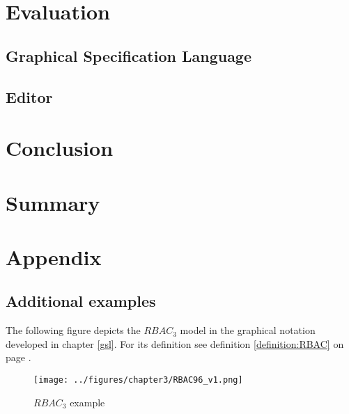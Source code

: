 \documentclass[twoside, openright, 12pt]{book}
\begin{document}



\cleardoublepage
\chapter{Evaluation}
\label{evaluation}



\section{Graphical Specification Language}
\label{evaluation_gsl}

\section{Editor}
\label{evaluation_editor}


\cleardoublepage
\chapter{Conclusion}
\label{conclusion}
\blindtext



\cleardoublepage
\chapter{Summary}
\label{summary}
\blindtext



\cleardoublepage
{}
\renewcommand{\thesection}{\Alph{section}}
\chapter*{Appendix}
\label{appendix}
\section{Additional examples}
The following figure depicts the $RBAC_3$ model in the graphical notation developed in chapter \ref{gsl}.
For its definition see definition \ref{definition:RBAC} on page \pageref{definition:RBAC}.

\begin{figure}[htb]
	\centering
	\texttt{[image: ../figures/chapter3/RBAC96\_v1.png]}
	\caption{$RBAC_3$ example}
	\label{fig:RBAC96_example}
\end{figure}



\cleardoublepage
\DeclareRobustCommand{\citeext}[1]{\citeauthor{#1}~\cite{#1}}




\end{document}

